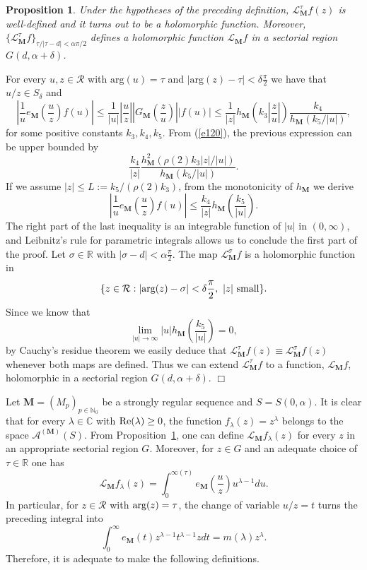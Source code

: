 \documentclass[11pt,a4paper,leqno]{article}
\theoremstyle{plain}
\newtheorem{prop}[theo]{Proposition}
\theoremstyle{definition}
\newenvironment{proof1}{\medskip\par\noindent{\bf Proof}}{\hfill $\Box$
\medskip\par}
\def\C{\mathbb{C}}
\def\N{\mathbb{N}}
\def\R{\mathbb{R}}
\def\bM{\boldsymbol{M}}
\begin{document}
\begin{prop}\label{hollap}
Under the hypotheses of the preceding definition, $\mathcal{L}_{\bM}^{\tau}f(z)$ is well-defined and it turns out to be a holomorphic function. Moreover,
$\{\mathcal{L}_{\bM}^{\tau}f\}_{\tau/|\tau-d|<\alpha\pi/2}$ defines a holomorphic function $\mathcal{L}_{\bM}f$ in a
sectorial region $G(d,\alpha+\delta)$.
\end{prop}
\begin{proof1}
For every $u,z\in\mathcal{R}$ with $\mathrm{arg}(u)=\tau$ and $|\mathrm{arg}(z)-\tau|<\delta\frac{\pi}{2}$ we have that $u/z\in S_{\delta}$ and
$$\left|\frac{1}{u}e_{\bM}\left(\frac{u}{z}\right)f(u)\right|\le \frac{1}{|u|}\left|\frac{u}{z}\right|\left|G_{\bM}\left(\frac{z}{u}\right)\right||f(u)|\le \frac{1}{|z|}h_{\bM}\left(k_3\left|\frac{z}{u}\right|\right)\frac{k_4}{h_{\bM}(k_5/|u|)},
$$
for some positive constants $k_3,k_4,k_5$. From (\ref{e120}), the previous expression can be upper bounded by
$$\frac{k_4}{|z|}\frac{h_{\bM}^2(\rho(2)k_3|z|/|u|)}{h_{\bM}(k_5/|u|)}.$$
If we assume $|z|\le L:=k_5/(\rho(2)k_3)$, from the monotonicity of $h_{\bM}$ we derive
$$\left|\frac{1}{u}e_{\bM}\left(\frac{u}{z}\right)f(u)\right|\le \frac{k_4}{|z|}h_{\bM}\left(\frac{k_5}{|u|}\right).$$
The right part of the last inequality is an integrable function of $|u|$ in $(0,\infty)$, and Leibnitz's rule for parametric integrals allows us to conclude the first part of the proof.
Let $\sigma\in\R$ with $|\sigma-d|<\alpha\frac{\pi}{2}$. The map $\mathcal{L}^{\sigma}_{\bM}f$ is a holomorphic function in
$$\{z\in\mathcal{R}:|\hbox{arg}(z)-\sigma|<\delta\frac{\pi}{2},\ |z| \mathrm{\ small}\}.
$$
Since we know that
\begin{equation*}
\lim_{|u|\to\infty}|u|h_{\bM}\left(\frac{k_5}{|u|}\right)=0,
\end{equation*}
by Cauchy's residue theorem we easily deduce that $\mathcal{L}_{\bM}^{\tau}f(z)\equiv\mathcal{L}_{\bM}^{\sigma}f(z)$ whenever both maps are defined. Thus we can extend $\mathcal{L}_{\bM}^{\tau}f$ to a function, $\mathcal{L}_{\bM}f$, holomorphic in a sectorial region $G(d,\alpha+\delta)$.
\end{proof1}
Let $\bM=(M_{p})_{p\in\N_0}$ be a strongly regular sequence and $S=S(0,\alpha)$. It is clear that for every $\lambda\in\C$ with $\hbox{Re}(\lambda)\ge0$, the function $f_{\lambda}(z)=z^{\lambda}$ belongs to the space $\mathcal{A}^{(\bM)}(S)$. From Proposition~\ref{hollap}, one can define $\mathcal{L}_{\bM}f_{\lambda}(z)$ for every $z$ in an appropriate sectorial region $G$. Moreover, for $z\in G$ and an adequate choice of $\tau\in\R$ one has
$$\mathcal{L}_{\bM}f_{\lambda}(z)= \int_{0}^{\infty(\tau)}e_{\bM}\left(\frac{u}{z}\right)u^{\lambda-1}du.$$
In particular, for $z\in\mathcal{R}$ with $\hbox{arg}(z)=\tau$, the change of variable $u/z=t$ turns the preceding integral into
$$\int_{0}^{\infty}e_{\bM}(t)z^{\lambda-1}t^{\lambda-1}zdt=m(\lambda)z^{\lambda}.$$
Therefore, it is adequate to make the following definitions.
\end{document}
